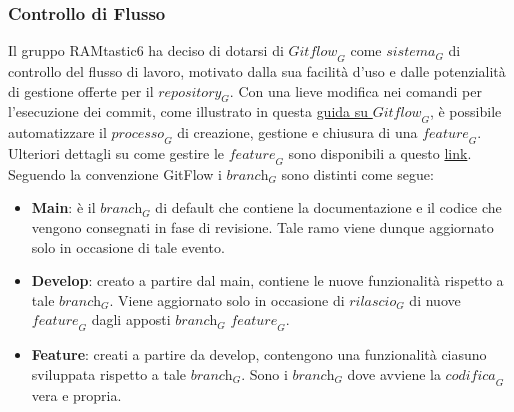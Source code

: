 \subsubsection{Controllo di Flusso}
Il gruppo RAMtastic6 ha deciso di dotarsi di $\textit{Gitflow}_G$ come $\textit{sistema}_G$ di controllo del flusso di lavoro, motivato dalla sua facilità d'uso e dalle potenzialità di gestione offerte per il $\textit{repository}_G$. Con una lieve modifica nei comandi per l'esecuzione dei commit, come illustrato in questa \href{https://www.atlassian.com/git/tutorials/comparing-workflows/gitflow-workflow}{guida su $\textit{Gitflow}_G$}, è possibile automatizzare il $\textit{processo}_G$ di creazione, gestione e chiusura di una $\textit{feature}_G$. Ulteriori dettagli su come gestire le $\textit{feature}_G$ sono disponibili a questo \href{http://danielkummer.github.io/git-flow-cheatsheet/}{link}.
Seguendo la convenzione GitFlow i $\textit{branch}_G$ sono distinti come segue:
\begin{itemize}
    \item \textbf{Main}: è il $\textit{branch}_G$ di default che contiene la documentazione e il codice che vengono consegnati in fase di revisione. Tale ramo viene dunque aggiornato solo in occasione di tale evento. 
    \item \textbf{Develop}: creato a partire dal main, contiene le nuove funzionalità rispetto a tale $\textit{branch}_G$. Viene aggiornato solo in occasione di $\textit{rilascio}_G$ di nuove $\textit{feature}_G$ dagli apposti $\textit{branch}_G$ $\textit{feature}_G$.
    \item \textbf{Feature}: creati a partire da develop, contengono una funzionalità ciasuno sviluppata rispetto a tale $\textit{branch}_G$. Sono i $\textit{branch}_G$ dove avviene la $\textit{codifica}_G$ vera e propria.
\end{itemize}
